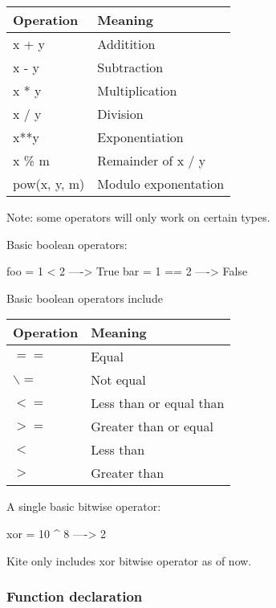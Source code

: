 \begin{table}[H]
\centering
    \begin{tabular}{|l|l|}
    \hline
    Operation    & Meaning              \\ \hline
    x + y        & Additition           \\ \hline
    x - y        & Subtraction          \\ \hline
    x * y        & Multiplication       \\ \hline
    x / y        & Division             \\ \hline
    x**y         & Exponentiation       \\ \hline
    x \% m       & Remainder of x / y   \\ \hline
    pow(x, y, m) & Modulo exponentation \\ \hline
    \end{tabular}
\end{table}
Note: some operators will only work on certain types.

Basic boolean operators:
\begin{kite}
  
  foo = 1 < 2  ----> True
  bar = 1 == 2 ----> False
\end{kite}
Basic boolean operators include 
\begin{table}[H]
\centering
    \begin{tabular}{|l|l|}
    \hline
    Operation & Meaning                 \\ \hline
    $==$        & Equal                   \\ \hline
    $\backslash=$        & Not equal               \\ \hline
    $<=$        & Less than or equal than \\ \hline
    $>=$        & Greater than or equal   \\ \hline
    $<$         & Less than               \\ \hline
    $>$         & Greater than            \\ \hline
    \end{tabular}
\end{table}

A single basic bitwise operator:
\begin{kite}
  
  xor = 10 ^ 8 ----> 2
\end{kite}
Kite only includes xor bitwise operator as of now.

\subsubsection{Function declaration}

